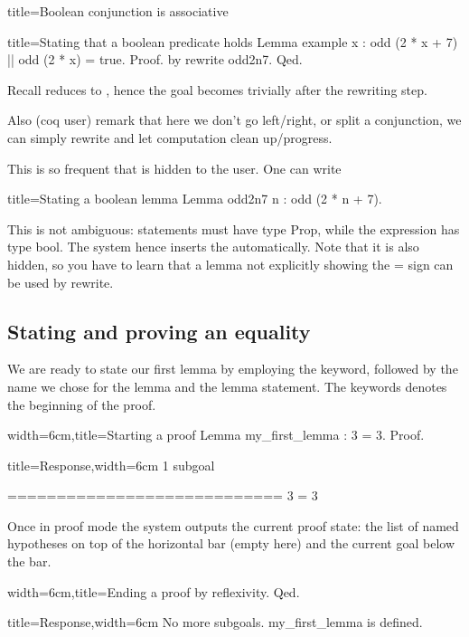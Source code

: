 \begin{coq}{title=Boolean conjunction is associative}
\begin{coq}{title=Stating that a boolean predicate holds}
Lemma example x : odd (2 * x + 7) || odd (2 * x) = true.
Proof. by rewrite odd2n7. Qed.
\end{coq}

Recall  reduces to , hence the
goal becomes trivially  after the
rewriting step.

Also (coq user) remark that here we don't go left/right, or split
a conjunction, we can simply rewrite and let computation clean up/progress.

This is so frequent that  is hidden to the user.
One can write

\begin{coq}{title=Stating a boolean lemma}
Lemma odd2n7 n : odd (2 * n + 7).
\end{coq}

This is not ambiguous: statements must have type Prop, while
the expression has type bool.  The system hence inserts
the  automatically.  Note that it is also hidden,
so you have to learn that a lemma not explicitly showing the
= sign can be used by rewrite.



\subsection{Stating and proving an equality}

We are ready to state our first lemma by employing the  keyword,
followed by the name we chose for the lemma and the lemma statement.
The  keywords denotes the beginning of the proof.

\begin{coq}{width=6cm,title=Starting a proof}
Lemma my_first_lemma : 3 = 3.
Proof.
\end{coq}
\begin{coqout}{title=Response,width=6cm}
1 subgoal

  ============================
   3 = 3
\end{coqout}

Once in proof mode the system outputs the current proof state:
the list of named hypotheses on top of the horizontal bar (empty here)
and the current goal below the bar.

\begin{coq}{width=6cm,title=Ending a proof}
by reflexivity.
Qed.
\end{coq}
\begin{coqout}{title=Response,width=6cm}
No more subgoals.
my_first_lemma is defined.
\end{coqout}


\end{coq}
